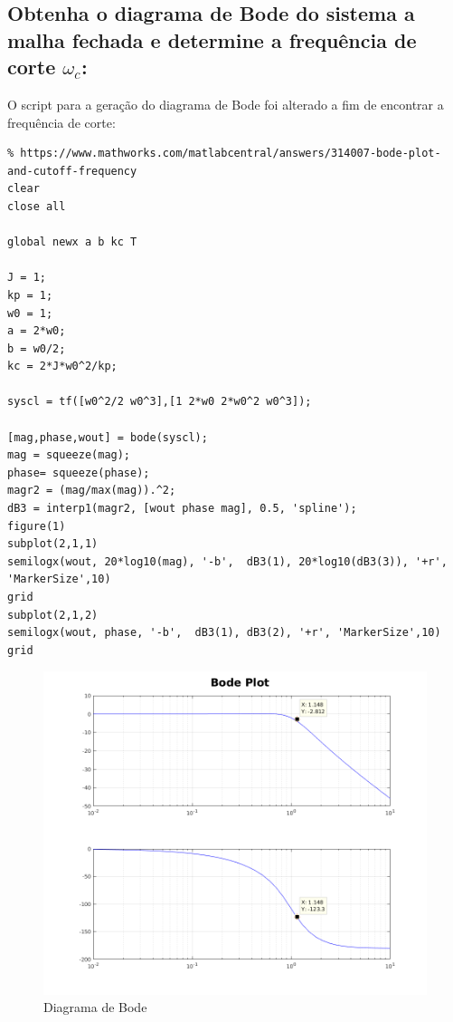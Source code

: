 \documentclass{article}
\begin{document}
\subsection{Obtenha o diagrama de Bode do sistema a malha fechada e determine a frequência de corte $\omega_c$:}

    {O script para a geração do diagrama de Bode foi alterado a fim de encontrar a frequência de corte:}
\begin{lstlisting}
% https://www.mathworks.com/matlabcentral/answers/314007-bode-plot-and-cutoff-frequency
clear
close all

global newx a b kc T

J = 1;
kp = 1;
w0 = 1;
a = 2*w0;
b = w0/2;
kc = 2*J*w0^2/kp;

syscl = tf([w0^2/2 w0^3],[1 2*w0 2*w0^2 w0^3]);

[mag,phase,wout] = bode(syscl);
mag = squeeze(mag);
phase= squeeze(phase);
magr2 = (mag/max(mag)).^2;
dB3 = interp1(magr2, [wout phase mag], 0.5, 'spline');
figure(1)
subplot(2,1,1)
semilogx(wout, 20*log10(mag), '-b',  dB3(1), 20*log10(dB3(3)), '+r', 'MarkerSize',10)
grid
subplot(2,1,2)
semilogx(wout, phase, '-b',  dB3(1), dB3(2), '+r', 'MarkerSize',10)
grid
\end{lstlisting}

    \begin{figure}[H]
        \centering
            \includegraphics[width=1\linewidth]{images/bode_plot.png}
            \caption{Diagrama de Bode}\label{fig:bode_plot}
    \end{figure}
\end{document}
